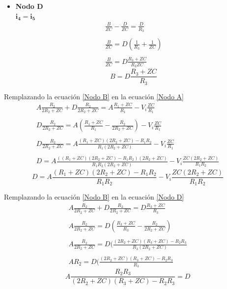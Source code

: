 \begin{itemize}
        \item \textbf{Nodo D} \\
        $ \mathbf{i_{4}=i_{5}}$
        \begin{align*}
            \frac{B}{ZC} - \frac{D}{ZC} = \frac{D}{R_{3}} \\\\
            \frac{B}{ZC} = D(\frac{1}{R_{3}} + \frac{1}{ZC}) \\\\
            \frac{B}{ZC} = D\frac{R_{3}+ZC}{R_{3}ZC}
        \end{align*}
        \begin{equation}\label{Nodo D}
            B = D\frac{R_{3}+ZC}{R_{3}}
        \end{equation}
    \end{itemize}
    
    Remplazando la ecuación \ref{Nodo B} en la ecuación \ref{Nodo A}
    \begin{align*}
        A\frac{R_{2}}{2R_{2}+ZC} + D\frac{R_{2}}{2R_{2}+ZC} = A\frac{R_{1}+ZC}{R_{1}} - V_{i}\frac{ZC}{R_{1}} \\\\
        D\frac{R_{2}}{2R_{2}+ZC} = A(\frac{R_{1}+ZC}{R_{1}} - \frac{R_{2}}{2R_{2}+ZC})- V_{i}\frac{ZC}{R_{1}} \\\\
        D\frac{R_{2}}{2R_{2}+ZC} = A\frac{(R_{1}+ZC)(2R_{2}+ZC) - R_{1}R_{2}}{R_{1}(2R_{2}+ZC)} - V_{i}\frac{ZC}{R_{1}} \\\\
        D = A\frac{((R_{1}+ZC)(2R_{2}+ZC) - R_{1}R_{2})(2R_{2}+ZC)}{R_{1}R_{2}(2R_{2}+ZC)} - V_{i}\frac{ZC(2R_{2}+ZC)}{R_{1}R_{2}}
    \end{align*}
    \begin{equation}\label{Nodo B en A}
        D = A\frac{(R_{1}+ZC)(2R_{2}+ZC) - R_{1}R_{2}}{R_{1}R_{2}} - V_{i}\frac{ZC(2R_{2}+ZC)}{R_{1}R_{2}}
    \end{equation}
    
    Remplazando la ecuación \ref{Nodo B} en la ecuación \ref{Nodo D}
    \begin{align*}
        A\frac{R_{2}}{2R_{2}+ZC} + D\frac{R_{2}}{2R_{2}+ZC} = D\frac{R_{3}+ZC}{R_{3}} \\\\
        A\frac{R_{2}}{2R_{2}+ZC} = D(\frac{R_{3}+ZC}{R_{3}}-\frac{R_{2}}{2R_{2}+ZC}) \\\\
        A\frac{R_{2}}{2R_{2}+ZC} = D(\frac{(2R_{2}+ZC)(R_{3}+ZC)-R_{2}R_{3}}{R_{3}(2R_{2}+ZC)} \\\\
        AR_{2} = D(\frac{(2R_{2}+ZC)(R_{3}+ZC)-R_{2}R_{3}}{R_{3}}
    \end{align*}
    \begin{equation}\label{Nodo B en D}
        A\frac{R_{2}R_{3}}{(2R_{2}+ZC)(R_{3}+ZC)-R_{2}R_{3}} = D 
    \end{equation}
    
